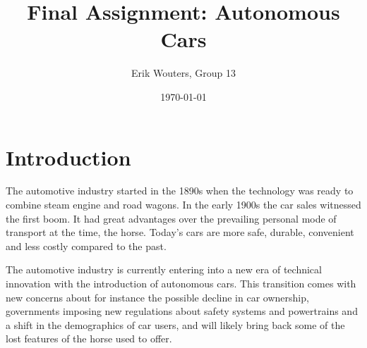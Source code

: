 \documentclass[a4paper]{article}
\title{Final Assignment: Autonomous Cars}
\author{Erik Wouters, Group 13}
\date{\today}
\begin{document}
\maketitle


\section{Introduction}
\label{sec:introduction}

The automotive industry started in the 1890s when the technology was ready to combine steam engine and road wagons. In the early 1900s the car sales witnessed the first boom. It had great advantages over the prevailing personal mode of transport at the time, the horse. Today's cars are more safe, durable, convenient and less costly compared to the past.

The automotive industry is currently entering into a new era of technical innovation with the introduction of autonomous cars. This transition comes with new concerns about for instance the possible decline in car ownership, governments imposing new regulations about safety systems and powertrains and a shift in the demographics of car users, and will likely bring back some of the lost features of the horse used to offer.
\end{document}

